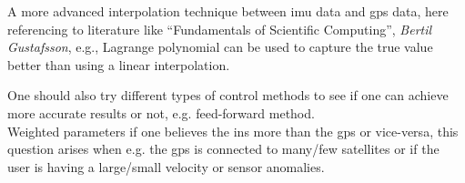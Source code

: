 A more advanced interpolation technique between \gls{imu} data and \gls{gps} data, here referencing to literature like ``Fundamentals of Scientific Computing'', \emph{Bertil Gustafsson}, e.g., Lagrange polynomial can be used to capture the true value better than using a linear interpolation.

One should also try different types of control methods to see if one can achieve more accurate results or not, e.g. feed-forward method.\\
Weighted parameters if one believes the \gls{ins} more than the \gls{gps} or vice-versa, this question arises when e.g. the \gls{gps} is connected to many/few satellites or if the user is having a large/small velocity or sensor anomalies. 




